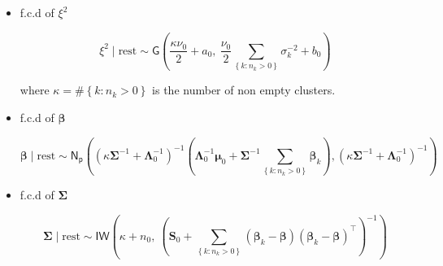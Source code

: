 \begin{itemize}
\begin{equation}
\label{CHLRM_MCMC_sigma2k}
\sigma_k^2 \mid \text{rest} \sim\mathsf{IG} \left( 
\frac{\nu_0 + \sum_{\left\lbrace j : \gamma_j = k\right\rbrace}n_j}{2},\ 
\frac{ \nu_0 \xi^2 + (\bm{y}_{k} - \bm{X}_{k} \bm{\beta}_k)^\top(\bm{y}_{k} - \bm{X}_{k} \bm{\beta}_k) }{2} 
\right)
\end{equation}

note that if cluster $k$ is empty, then the f.c.d of $\sigma_k^2$ is just $\sigma_k^2 \mid \text{rest} \sim\mathsf{IG}\left(\frac{\nu_0}{2},\frac{ \nu_0 \xi^2}{2}\right) $.

\item f.c.d of $\xi^2$

\begin{equation}
\label{CHLRM_MCMC_xi2}
\xi^2 \mid \text{rest} \sim \mathsf{G} \left(
\frac{\kappa \nu_0}{2} + a_0,\ 
\frac{\nu_0}{2} \sum_{\left\lbrace k : n_k > 0\right\rbrace} \sigma_k^{-2} + b_0
\right)
\end{equation}

where $\kappa = \#\left\lbrace k : n_k > 0\right\rbrace$ is the number of non empty clusters.

\item f.c.d of $\bm{\beta}$

\begin{equation}
\label{CHLRM_MCMC_Beta}
\bm{\beta} \mid \text{rest} \sim  \mathsf{N_p}\left(\left( \kappa \bm{\Sigma}^{-1} + \bm{\Lambda}_0^{-1} \right)^{-1}\left( \bm{\Lambda}_0^{-1} \bm{\mu}_0 + \bm{\Sigma}^{-1} \sum_{\left\lbrace k : n_k > 0\right\rbrace} \bm{\beta}_k \right), \left( \kappa \bm{\Sigma}^{-1} + \bm{\Lambda}_0^{-1} \right)^{-1}\right)
\end{equation}

\item f.c.d of $\bm{\Sigma}$

\begin{equation}
\label{CHLRM_MCMC_Sigma}
\bm{\Sigma} \mid \text{rest} \sim \mathsf{IW} \left(
\kappa + n_0,\ 
\left(\bm{S}_0 + \sum_{\left\lbrace k : n_k > 0\right\rbrace} (\bm{\beta}_k - \bm{\beta})(\bm{\beta}_k - \bm{\beta})^\top
\right)^{-1}\right)
\end{equation}


\end{itemize}

